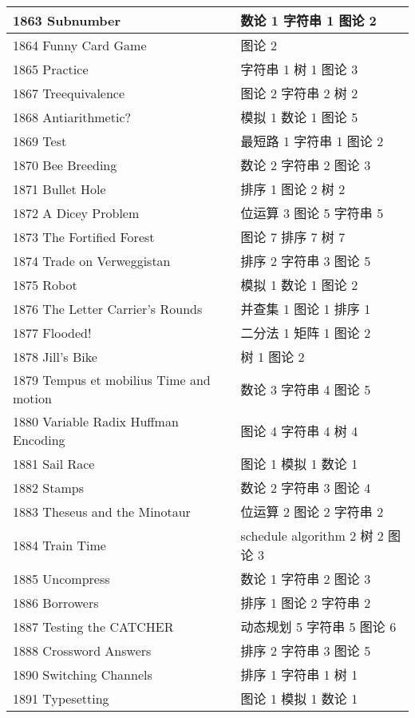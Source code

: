\begin{longtable}{| p{} | p{} |}
 1863 Subnumber  & 数论 1 字符串 1 图论 2 \\ \hline
 1864 Funny Card Game  & 图论 2 \\ \hline
 1865 Practice  & 字符串 1 树 1 图论 3 \\ \hline
 1867 Treequivalence  & 图论 2 字符串 2 树 2 \\ \hline
 1868 Antiarithmetic?  & 模拟 1 数论 1 图论 5 \\ \hline
 1869 Test  & 最短路 1 字符串 1 图论 2 \\ \hline
 1870 Bee Breeding  & 数论 2 字符串 2 图论 3 \\ \hline
 1871 Bullet Hole  & 排序 1 图论 2 树 2 \\ \hline
 1872 A Dicey Problem  & 位运算 3 图论 5 字符串 5 \\ \hline
 1873 The Fortified Forest  & 图论 7 排序 7 树 7 \\ \hline
 1874 Trade on Verweggistan  & 排序 2 字符串 3 图论 5 \\ \hline
 1875 Robot  & 模拟 1 数论 1 图论 2 \\ \hline
 1876 The Letter Carrier's Rounds  & 并查集 1 图论 1 排序 1 \\ \hline
 1877 Flooded!  & 二分法 1 矩阵 1 图论 2 \\ \hline
 1878 Jill's Bike  & 树 1 图论 2 \\ \hline
 1879 Tempus et mobilius Time and motion  & 数论 3 字符串 4 图论 5 \\ \hline
 1880 Variable Radix Huffman Encoding  & 图论 4 字符串 4 树 4 \\ \hline
 1881 Sail Race  & 图论 1 模拟 1 数论 1 \\ \hline
 1882 Stamps  & 数论 2 字符串 3 图论 4 \\ \hline
 1883 Theseus and the Minotaur  & 位运算 2 图论 2 字符串 2 \\ \hline
 1884 Train Time  & schedule algorithm 2 树 2 图论 3 \\ \hline
 1885 Uncompress  & 数论 1 字符串 2 图论 3 \\ \hline
 1886 Borrowers  & 排序 1 图论 2 字符串 2 \\ \hline
 1887 Testing the CATCHER  & 动态规划 5 字符串 5 图论 6 \\ \hline
 1888 Crossword Answers  & 排序 2 字符串 3 图论 5 \\ \hline
 1890 Switching Channels  & 排序 1 字符串 1 树 1 \\ \hline
 1891 Typesetting  & 图论 1 模拟 1 数论 1 \\ \hline

\end{longtable}
